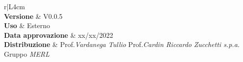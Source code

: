 \begin{center}
	\begin{tabular}{r|L{4cm}}
			 \\
			\hline
			\textbf{Versione}			& V0.0.5 \\
			\textbf{Uso}		& Esterno \\
			\textbf{Data approvazione} 			& xx/xx/2022 \\
			\textbf{Distribuzione} 	&	Prof.\textit{Vardanega Tullio} \newline Prof.\textit{Cardin Riccardo} \newline \textit{Zucchetti s.p.a.} \newline Gruppo \textit{MERL} \\
	\end{tabular}
\end{center}
